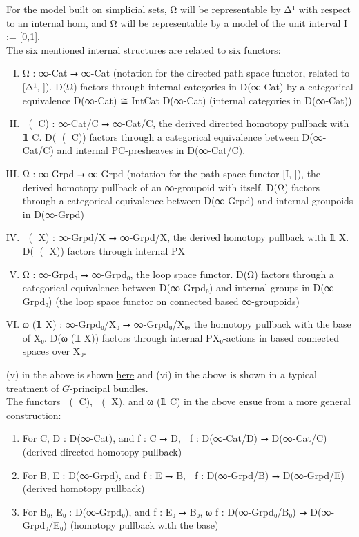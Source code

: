 \documentclass{book}
\theoremstyle{definition}
\begin{document}
For the model built on simplicial sets, Ω⃗ will be representable by Δ¹ with respect to an internal hom, and Ω⃡ will be representable by a model of the unit interval I := [0,1].\\

The six mentioned internal structures are related to six functors:

\begin{enumerate}[(I)]
\item Ω⃗ : ∞-Cat ⭢ ∞-Cat (notation for the directed path space functor, related to [Δ¹,-]). D(Ω⃗) factors through internal categories in D(∞-Cat) by a categorical equivalence D(∞-Cat) ≅ IntCat D(∞-Cat) (internal categories in D(∞-Cat))
\item ω⃗ (𝟙 C) : ∞-Cat/C ⭢ ∞-Cat/C, the derived directed homotopy pullback with 𝟙 C. D(ω⃗ (𝟙 C)) factors through a categorical equivalence between D(∞-Cat/C) and internal P⃗C-presheaves in D(∞-Cat/C).
\item Ω⃡ : ∞-Grpd ⭢ ∞-Grpd (notation for the path space functor [I,-]), the derived homotopy pullback of an ∞-groupoid with itself. D(Ω⃡) factors through a categorical equivalence between D(∞-Grpd) and internal groupoids in D(∞-Grpd)
\item ω⃡ (𝟙 X) : ∞-Grpd/X ⭢ ∞-Grpd/X, the derived homotopy pullback with 𝟙 X. D(ω⃡ (𝟙 X)) factors through internal P⃡X
\item Ω : ∞-Grpd₀ ⭢ ∞-Grpd₀, the loop space functor. D(Ω) factors through a categorical equivalence between D(∞-Grpd₀) and internal groups in D(∞-Grpd₀) (the loop space functor on connected based ∞-groupoids)
\item ω (𝟙 X) : ∞-Grpd₀/X₀ ⭢ ∞-Grpd₀/X₀, the homotopy pullback with the base of X₀. D(ω (𝟙 X)) factors through internal PX₀-actions in based connected spaces over X₀.
\end{enumerate}

(v) in the above is shown \href{https://mathoverflow.net/questions/128883/why-omega-x-and-bg-are-adjoint-functors}{here} and (vi) in the above is shown in a typical treatment of $G$-principal bundles.\\

The functors ω⃗ (𝟙 C), ω⃡ (𝟙 X), and ω (𝟙 C) in the above ensue from a more general construction:\\

\begin{enumerate}
\item For C, D : D(∞-Cat), and f : C ⭢ D, ω⃗ f : D(∞-Cat/D) ⭢ D(∞-Cat/C)   (derived directed homotopy pullback)
\item For B, E : D(∞-Grpd), and f : E ⭢ B, ω⃡ f : D(∞-Grpd/B) ⭢ D(∞-Grpd/E) (derived homotopy pullback)
\item For B₀, E₀ : D(∞-Grpd₀), and f : E₀ ⭢ B₀, ω f : D(∞-Grpd₀/B₀) ⭢ D(∞-Grpd₀/E₀) (homotopy pullback with the base)
\end{enumerate}
\end{document}
